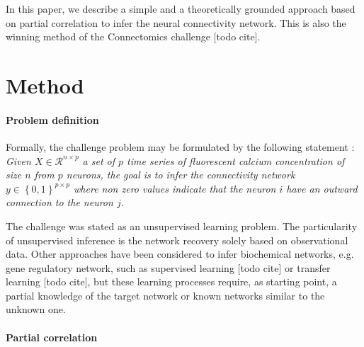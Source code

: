 \documentclass[wcp]{jmlr}
\begin{document}
In this paper, we describe a simple and a theoretically grounded approach
based on partial correlation to infer the neural connectivity network.
This is also the winning method of the Connectomics challenge [todo cite].

\section{Method}

\paragraph{Problem definition\\}


Formally, the challenge problem may be formulated by the following statement :
\textit{Given $X \in \mathcal{R}^{n \times p}$  a set of $p$ time series of fluorescent
calcium concentration of size $n$ from $p$ neurons, the goal is to infer the
connectivity network $y \in \left\{0, 1\right\}^{p \times p}$ where
non zero values indicate that the neuron $i$ have an outward connection to
the neuron $j$.}


The challenge was stated as an unsupervised learning problem. The particularity
of unsupervised inference is the network recovery solely based on
observational data. Other approaches have been considered to infer biochemical
networks, e.g. gene regulatory network, such as supervised learning [todo cite]
or transfer learning [todo cite], but these learning processes require, as
starting point, a partial knowledge of the target network or known networks
similar to the unknown one.

\paragraph{Partial correlation\\}
\end{document}
